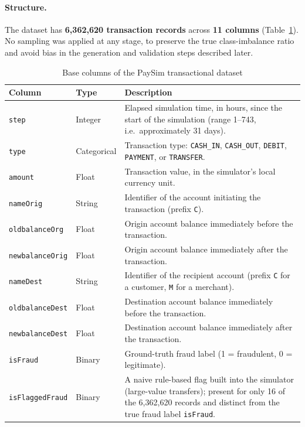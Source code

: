 \paragraph{Structure.} The dataset has \textbf{6,362,620 transaction records} across \textbf{11 columns} (Table~\ref{tab:paysim-columns}). No sampling was applied at any stage, to preserve the true class-imbalance ratio and avoid bias in the generation and validation steps described later.

\begin{table}[htbp]
\centering
\caption{Base columns of the PaySim transactional dataset}
\label{tab:paysim-columns}
\footnotesize
\begin{tabular}{@{}llp{7.5cm}@{}}
\toprule
\textbf{Column} & \textbf{Type} & \textbf{Description} \\
\midrule
\texttt{step} & Integer & Elapsed simulation time, in hours, since the start of the simulation (range 1--743, i.e.\ approximately 31 days). \\
\texttt{type} & Categorical & Transaction type: \texttt{CASH\_IN}, \texttt{CASH\_OUT}, \texttt{DEBIT}, \texttt{PAYMENT}, or \texttt{TRANSFER}. \\
\texttt{amount} & Float & Transaction value, in the simulator's local currency unit. \\
\texttt{nameOrig} & String & Identifier of the account initiating the transaction (prefix \texttt{C}). \\
\texttt{oldbalanceOrg} & Float & Origin account balance immediately before the transaction. \\
\texttt{newbalanceOrig} & Float & Origin account balance immediately after the transaction. \\
\texttt{nameDest} & String & Identifier of the recipient account (prefix \texttt{C} for a customer, \texttt{M} for a merchant). \\
\texttt{oldbalanceDest} & Float & Destination account balance immediately before the transaction. \\
\texttt{newbalanceDest} & Float & Destination account balance immediately after the transaction. \\
\texttt{isFraud} & Binary & Ground-truth fraud label (1 = fraudulent, 0 = legitimate). \\
\texttt{isFlaggedFraud} & Binary & A naive rule-based flag built into the simulator (large-value transfers); present for only 16 of the 6,362,620 records and distinct from the true fraud label \texttt{isFraud}. \\
\bottomrule
\end{tabular}
\end{table}

